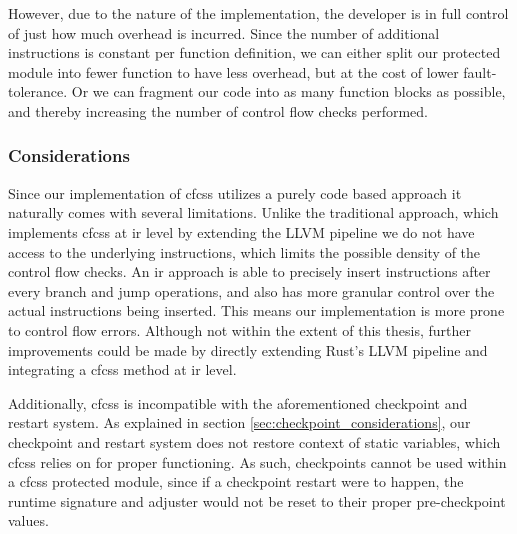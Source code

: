 However, due to the nature of the implementation, the developer is in full control of just how much overhead is incurred. Since the number of additional instructions is constant per function definition, we can either split our protected module into fewer function to have less overhead, but at the cost of lower fault-tolerance. Or we can fragment our code into as many function blocks as possible, and thereby increasing the number of control flow checks performed.

\subsubsection{Considerations}

Since our implementation of \acrshort{cfcss} utilizes a purely code based approach it naturally comes with several limitations. Unlike the traditional approach, which implements \acrshort{cfcss} at \acrshort{ir} level by extending the LLVM pipeline we do not have access to the underlying instructions, which limits the possible density of the control flow checks. An \acrshort{ir} approach is able to precisely insert instructions after every branch and jump operations, and also has more granular control over the actual instructions being inserted. This means our implementation is more prone to control flow errors. Although not within the extent of this thesis, further improvements could be made by directly extending Rust's LLVM pipeline and integrating a \acrshort{cfcss} method at \acrshort{ir} level.

Additionally, \acrshort{cfcss} is incompatible with the aforementioned checkpoint and restart system. As explained in section \ref{sec:checkpoint_considerations}, our checkpoint and restart system does not restore context of static variables, which \acrshort{cfcss} relies on for proper functioning. As such, checkpoints cannot be used within a \acrshort{cfcss} protected module, since if a checkpoint restart were to happen, the runtime signature and adjuster would not be reset to their proper pre-checkpoint values.